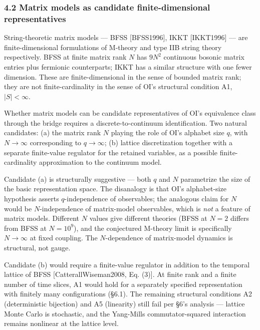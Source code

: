 \documentclass[
]{article}
\begin{document}
\hypertarget{matrix-models-as-candidate-finite-dimensional-representatives}{%
\subsubsection{4.2 Matrix models as candidate finite-dimensional
representatives}\label{matrix-models-as-candidate-finite-dimensional-representatives}}

String-theoretic matrix models --- BFSS {[}BFSS1996{]}, IKKT
{[}IKKT1996{]} --- are finite-dimensional formulations of M-theory and
type IIB string theory respectively. BFSS at finite matrix rank \(N\)
has \(9N^2\) continuous bosonic matrix entries plus fermionic
counterparts; IKKT has a similar structure with one fewer dimension.
These are finite-dimensional in the sense of bounded matrix rank; they
are not finite-cardinality in the sense of OI's structural condition A1,
\(|S| < \infty\).

Whether matrix models can be candidate representatives of OI's
equivalence class through the bridge requires a discrete-to-continuum
identification. Two natural candidates: (a) the matrix rank \(N\)
playing the role of OI's alphabet size \(q\), with \(N \to \infty\)
corresponding to \(q \to \infty\); (b) lattice discretization together
with a separate finite-value regulator for the retained variables, as a
possible finite-cardinality approximation to the continuum model.

Candidate (a) is structurally suggestive --- both \(q\) and \(N\)
parametrize the size of the basic representation space. The disanalogy
is that OI's alphabet-size hypothesis asserts \(q\)-independence of
observables; the analogous claim for \(N\) would be \(N\)-independence
of matrix-model observables, which is \emph{not} a feature of matrix
models. Different \(N\) values give different theories (BFSS at \(N=2\)
differs from BFSS at \(N=10^9\)), and the conjectured M-theory limit is
specifically \(N \to \infty\) at fixed coupling. The \(N\)-dependence of
matrix-model dynamics is structural, not gauge.

Candidate (b) would require a finite-value regulator in addition to the
temporal lattice of BFSS {[}CatterallWiseman2008, Eq. (3){]}. At finite
rank and a finite number of time slices, A1 would hold for a separately
specified representation with finitely many configurations (§6.1). The
remaining structural conditions A2 (deterministic bijection) and A5
(linearity) still fail per §6's analysis --- lattice Monte Carlo is
stochastic, and the Yang-Mills commutator-squared interaction remains
nonlinear at the lattice level.
\end{document}
